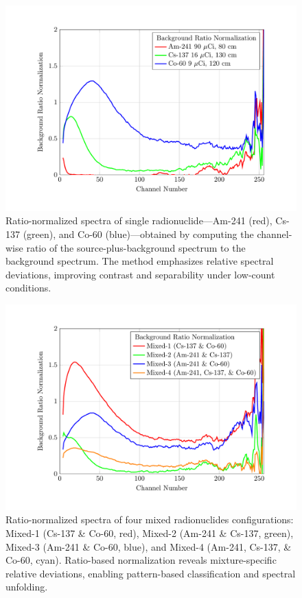 \documentclass[10pt]{wlscirep}
\begin{document}
\newpage

\begin{figure}[ht]
\centering
\includegraphics[width=\linewidth]{figure/fig05_CSRN.pdf}
\caption{ Ratio-normalized spectra of single radionuclide—Am-241 (red), Cs-137 (green), and Co-60 (blue)—obtained by computing the channel-wise ratio of the source-plus-background spectrum to the background spectrum. The method emphasizes relative spectral deviations, improving contrast and separability under low-count conditions.}
\label{fig:csbs}
\end{figure}

\newpage

\begin{figure}[ht]
\centering
\includegraphics[width=\linewidth]{figure/fig06_CSBRS.pdf}
\caption{Ratio-normalized spectra of four mixed radionuclides configurations: Mixed-1 (Cs-137 \& Co-60, red), Mixed-2 (Am-241 \& Cs-137, green), Mixed-3 (Am-241 \& Co-60, blue), and Mixed-4 (Am-241, Cs-137, \& Co-60, cyan). Ratio-based normalization reveals mixture-specific relative deviations, enabling pattern-based classification and spectral unfolding.}
\label{fig:fi_CSBRS}
\end{figure}
\end{document}
